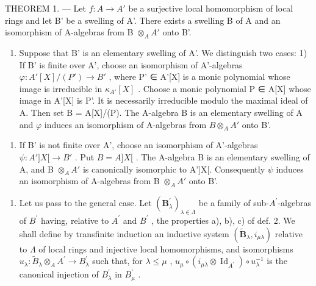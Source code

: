 THEOREM 1. --- Let \(f:A\to A'\) be a surjective local homomorphism of local rings and let B' be a swelling of A'. There exists a swelling B of A and an isomorphism of A-algebras from B \(\otimes_{A}A'\) onto B'.

\begin{enumerate}
\def\labelenumi{\Alph{enumi})}
\tightlist
\item
  Suppose that B' is an elementary swelling of A'. We distinguish two cases: 1) If B' is finite over A', choose an isomorphism of A'-algebras \(\varphi: A'[X]/(P') \to B'\) , where P' ∈ A'{[}X{]} is a monic polynomial whose image is irreducible in \(\kappa_{A'}[X]\) . Choose a monic polynomial P ∈ A{[}X{]} whose image in A'{[}X{]} is P'. It is necessarily irreducible modulo the maximal ideal of A. Then set B = A{[}X{]}/(P). The A-algebra B is an elementary swelling of A and \(\varphi\) induces an isomorphism of A-algebras from \(B \otimes_{A} A'\) onto B'.
\end{enumerate}

\begin{enumerate}
\def\labelenumi{\arabic{enumi})}
\setcounter{enumi}{1}
\tightlist
\item
  If B' is not finite over A', choose an isomorphism of A'-algebras \(\psi : A']X[\to B'\) . Put \(B = A]X[\) . The A-algebra B is an elementary swelling of A, and B \(\otimes_{A} A'\) is canonically isomorphic to A'{]}X{[}. Consequently \(\psi\) induces an isomorphism of A-algebras from B \(\otimes_{A} A'\) onto B'.
\end{enumerate}

\begin{enumerate}
\def\labelenumi{\Alph{enumi})}
\setcounter{enumi}{1}
\tightlist
\item
  Let us pass to the general case. Let \((\mathbf{B}_{\lambda}^{\prime})_{\lambda\in\Lambda}\) be a family of sub-\(A^{\prime}\)-algebras of \(B^{\prime}\) having, relative to \(A^{\prime}\) and \(B^{\prime}\) , the properties a), b), c) of def. 2. We shall define by transfinite induction an inductive system \((\widetilde{\mathbf{B}}_{\lambda}, i_{\mu\lambda})\) relative to \(\Lambda\) of local rings and injective local homomorphisms, and isomorphisms \(u_{\lambda}: \widetilde{B}_{\lambda} \otimes_{A} A^{\prime} \to B_{\lambda}^{\prime}\) such that, for \(\lambda \leqslant \mu\) , \(u_{\mu} \circ (i_{\mu\lambda} \otimes \operatorname{Id}_{A^{\prime}}) \circ u_{\lambda}^{-1}\) is the canonical injection of \(B_{\lambda}^{\prime}\) in \(B_{\mu}^{\prime}\) .
\end{enumerate}

